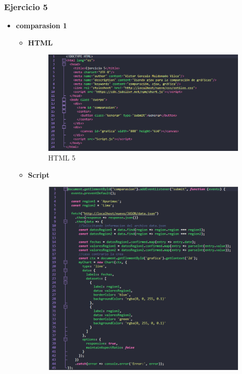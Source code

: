 \documentclass{article}
\begin{document}
	\subsubsection{Ejercicio 5}
	\begin{itemize}
		\item \textbf{comparasion 1}
		\begin{itemize}
			\item \textbf{HTML}
			\begin{figure}[H]
				\centering
				\includegraphics[width=1\textwidth,keepaspectratio]{img/html5.png}
				\caption{HTML 5}
			\end{figure}
			\newpage
			\item \textbf{Script}
			\begin{figure}[H]
				\centering
				\includegraphics[width=1\textwidth,keepaspectratio]{img/Script5-1.png}

\end{figure}
\end{itemize}
\end{itemize}
\end{document}
